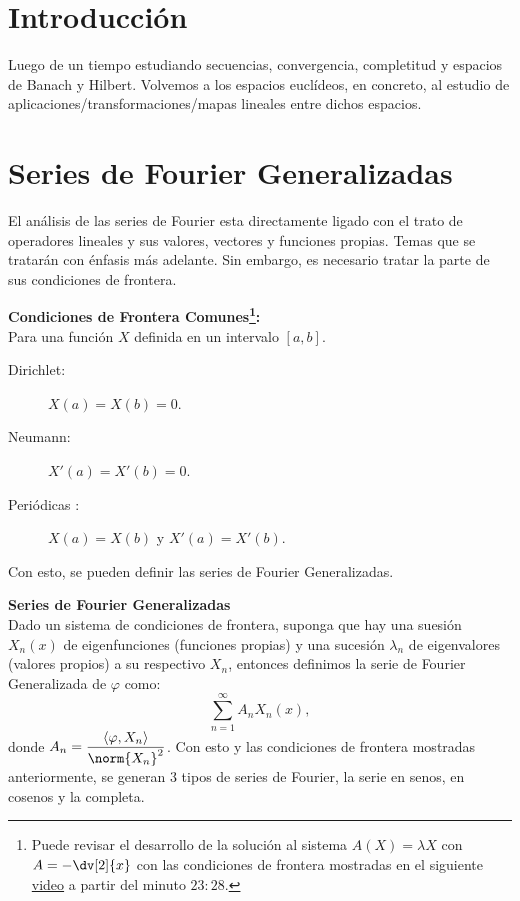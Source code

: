 \section*{Introducción}
Luego de un tiempo estudiando secuencias, convergencia, completitud y espacios de Banach y Hilbert. Volvemos a los espacios euclídeos, en concreto, al estudio de aplicaciones/transformaciones/mapas lineales entre dichos espacios. 


\section*{Series de Fourier Generalizadas}

El análisis de las series de Fourier esta directamente ligado con el trato de operadores lineales y sus valores, vectores y funciones propias. Temas que se tratarán con énfasis más adelante. Sin embargo, es necesario tratar la parte de sus condiciones de frontera.



\begin{mdframed}[style=warning]
	{\large \textbf{Condiciones de Frontera Comunes\footnote{Puede revisar el desarrollo de la solución al sistema $A(X) = \lambda X$ con $A = -\dv[2]{x}$ con las condiciones de frontera mostradas en el siguiente \href{https://www.youtube.com/watch?v=hhb7Wou8UzI}{video} a partir del minuto $23:28$.}:}} \\
	Para una función $X$ definida en un intervalo $[a,b]$.
	\begin{description}
		\item[Dirichlet: ] $X(a) = X(b) = 0$.
		\item[Neumann: ] $X'(a) = X'(b) = 0$.
		\item[Periódicas : ] $X(a) = X(b)$ y $X'(a) = X'(b)$.
	\end{description}
\end{mdframed}

Con esto, se pueden definir las series de Fourier Generalizadas.


\begin{mdframed}[style=warning]
	{\large \textbf{Series de Fourier Generalizadas}} \\
	Dado un sistema de condiciones de frontera, suponga que hay una suesión $X_n (x)$ de eigenfunciones (funciones propias) y una sucesión $\lambda _n$ de eigenvalores (valores propios) a su respectivo $X_n$, entonces definimos la serie de Fourier Generalizada de $\varphi$ como:
		$$ \sum _{n = 1} ^\infty A_n X_n(x), $$
	donde $A_n = \dfrac{\inner{\varphi}{X_n}}{\norm{X_n}^2}$. Con esto y las condiciones de frontera mostradas anteriormente, se generan $3$ tipos de series de Fourier, la serie en senos, en cosenos y la completa.
\end{mdframed}






